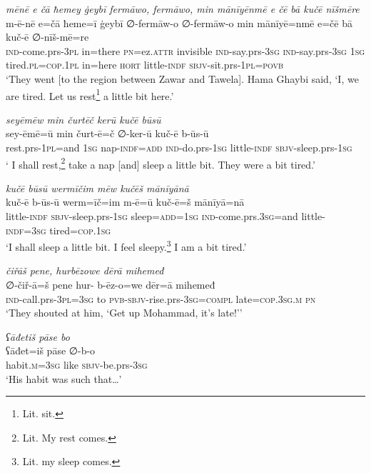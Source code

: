 \ea \label{BP.181}
\textit{mēnē e čā ħemey ġeybī fermāwo, fermāwo, min mānīyēnmē e čē bā kučē nīšmēre} \\ 
\gll m-ē-nē e=čā ħeme=ī ġeybī ∅-fermāw-o ∅-fermāw-o min mānīyē=nmē e=čē bā kuč-ē ∅-nīš-mē=re \\ 
 \textsc{ind-}come.prs\textsc{-3pl} in=there \textsc{pn}=ez.\textsc{attr} invisible \textsc{ind-}say.prs\textsc{-3sg} \textsc{ind-}say.prs\textsc{-3sg} \textsc{1sg} tired\textsc{.pl}\textsc{=cop}\textsc{.\textsc{1pl}} in=here \textsc{hort} little\textsc{-indf} \textsc{sbjv-}sit.prs\textsc{-\textsc{1pl}}\textsc{=\textsc{povb}} \\ 
\glt `They went [to the region between Zawar and Tawela]. Hama Ghaybi said, ‘I, we are tired. Let us rest\footnote{Lit. sit.} a little bit here.'
\z 
 
\ea \label{BP.182}
\textit{seyēmēw min čurtēč kerū kučē būsū} \\ 
\gll sey-ēmē=ū min čurt-ē=č ∅-ker-ū kuč-ē b-ūs-ū \\ 
 rest.prs-\textsc{1pl}=and \textsc{1sg} nap\textsc{-indf}\textsc{=add} \textsc{ind-}do.prs\textsc{-\textsc{1sg}} little\textsc{-indf} \textsc{sbjv-}sleep.prs\textsc{-\textsc{1sg}} \\ 
\glt ` I shall rest,\footnote{Lit. My rest comes.} take a nap [and] sleep a little bit. They were a bit tired.'
\z 
 
\ea \label{BP.183}
\textit{kučē būsū wermīčim mēw kučēš mānīyānā} \\ 
\gll kuč-ē b-ūs-ū werm=īč=im m-ē=ū kuč-ē=š mānīyā=nā \\ 
 little\textsc{-indf} \textsc{sbjv-}sleep.prs\textsc{-\textsc{1sg}} sleep\textsc{=add}\textsc{=\textsc{1sg}} \textsc{ind-}come.prs\textsc{.3sg}=and little\textsc{-indf}\textsc{=3sg} tired\textsc{=cop}\textsc{.\textsc{1sg}} \\ 
\glt `I shall sleep a little bit. I feel sleepy.\footnote{Lit. my sleep comes.} I am a bit tired.'
\z 
 
\ea \label{BP.192}
\textit{čiřāš pene, hurbēzowe dērā mihemeđ} \\ 
\gll ∅-čiř-ā=š pene hur- b-ēz-o=we dēr=ā mihemeđ \\ 
 \textsc{ind-}call.prs\textsc{-3pl}\textsc{=3sg} to \textsc{pvb-}\textsc{sbjv-}rise.prs\textsc{-3sg}\textsc{=compl} late\textsc{=cop}\textsc{.3sg}\textsc{.m} \textsc{pn} \\ 
\glt `They shouted at him, ‘Get up Mohammad, it’s late!’'
\z 
 
\ea \label{ŠJ.4}
\textit{ʕāđetiš pāse bo} \\ 
\gll ʕāđet=iš pāse ∅-b-o \\ 
 habit\textsc{.m}\textsc{=3sg} like \textsc{sbjv-}be.prs\textsc{-3sg} \\ 
\glt `His habit was such that…'
\z 
 
